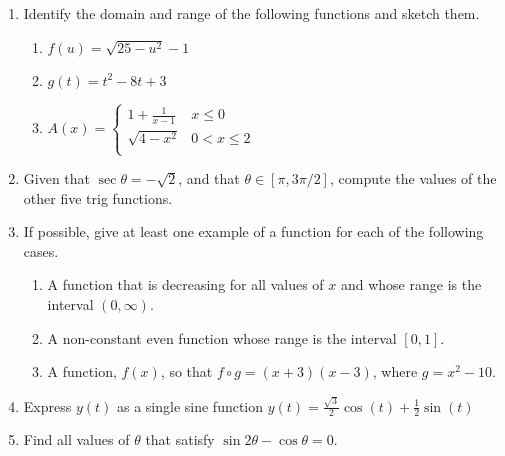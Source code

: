 \begin{enumerate}
	\item Identify the domain and range of the following functions and sketch them. 
    \begin{enumerate}
    	\item $\displaystyle{f(u) = \sqrt{25 - u^2}-1}$
        \item $g(t) = t^2 -8t + 3$
        \item $A(x) = \begin{cases} 
      \displaystyle{1+\frac{1}{x-1}} & x\leq 0 \\[8pt]
      \displaystyle{\sqrt{4 - x^2}} & 0 < x\leq 2 \\
   \end{cases}$
    \end{enumerate}
	\item Given that $\sec \theta = -\sqrt{2}$, and that $\theta \in [\pi,3\pi/2]$, compute the values of the other five trig functions.
    \item If possible, give at least one example of a function for each of the following cases.
    \begin{enumerate}
    	\item A function that is decreasing for all values of $x$ and whose range is the interval $(0,\infty)$.
        \item A non-constant even function whose range is the interval $[0,1]$.
        \item A function, $f(x)$, so that $f \circ g = (x+3)(x-3)$, where $g = x^2 - 10$.
    \end{enumerate}
    \item Express $y(t)$ as a single sine function $y(t) = \frac{\sqrt{3}}{2}\cos(t) + \frac{1}{2}\sin(t)$
    \item Find all values of $\theta$ that satisfy $\sin2\theta-\cos\theta = 0$.
\end{enumerate}